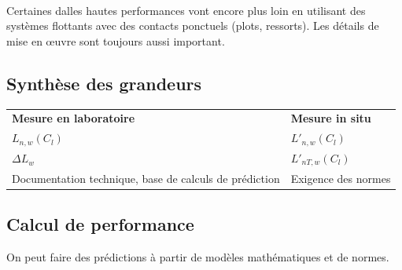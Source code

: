 \documentclass[11pt]{report}
\begin{document}
\\

\vspace{5mm}
Certaines dalles hautes performances vont encore plus loin en utilisant des systèmes flottants avec des contacts ponctuels (plots, ressorts). Les détails de mise en œuvre sont toujours aussi important.


\subsection{Synthèse des grandeurs}
\begin{center}
\begin{tabular}{C{6cm}C{6cm}}
\textbf{Mesure en laboratoire} & \textbf{Mesure in situ}\\
$L_{n,w} (C_l)$ & $L'_{n,w} (C_l)$\\
$\Delta L_w $ & $L'_{nT,w} (C_l)$\\
Documentation technique, base de calculs de prédiction & Exigence des normes 
\end{tabular}
\end{center}


\subsection{Calcul de performance}
On peut faire des prédictions à partir de modèles mathématiques et de normes.
\end{document}
